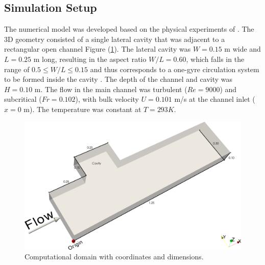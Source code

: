 \subsection{Simulation Setup}
The numerical model was developed based on the physical experiments of \textcite{xiang2019}. The 3D geometry consisted of a single lateral cavity that was adjacent to a rectangular open channel Figure (\ref{fig:art4:domain}). The lateral cavity was $W=0.15$ m wide and $L = 0.25$ m long, resulting in the aspect ratio $W/L=0.60$, which falls in the range of $0.5\leq W/L\leq 0.15$ and thus corresponds to a one-gyre circulation system to be formed inside the cavity \textcite{Uijttewaal2001}. The depth of the channel and cavity was $H=0.10$ m. The flow in the main channel was turbulent ($Re=9000$) and subcritical ($Fr=0.102$), with bulk velocity $U = 0.101$ m/s at the channel inlet ($x=0$ m). The temperature was constant at $T=293K$.

\begin{figure}[!htb]
\centering
\includegraphics[width=\linewidth]{../images/art4/domain.png}
\caption{Computational domain with coordinates and dimensions.}
\label{fig:art4:domain}
\end{figure}


